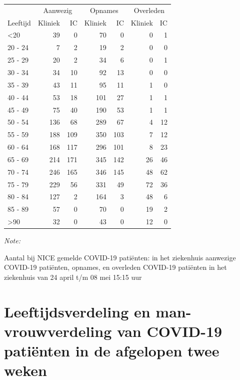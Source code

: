 \documentclass[
  english,
  man,floatsintext]{apa6}
\begin{document}
\begin{table}
\centering\begingroup\fontsize{10}{12}\selectfont

\begin{threeparttable}
\begin{tabular}{lrrrrrr}
\toprule
\multicolumn{1}{c}{ } & \multicolumn{2}{c}{Aanwezig} & \multicolumn{2}{c}{Opnames} & \multicolumn{2}{c}{Overleden} \\
\cmidrule(l{3pt}r{3pt}){2-3} \cmidrule(l{3pt}r{3pt}){4-5} \cmidrule(l{3pt}r{3pt}){6-7}
Leeftijd & Kliniek & IC & Kliniek & IC & Kliniek & IC\\
\midrule
<20 & 39 & 0 & 70 & 0 & 0 & 1\\
20 - 24 & 7 & 2 & 19 & 2 & 0 & 0\\
25 - 29 & 20 & 2 & 34 & 6 & 0 & 1\\
30 - 34 & 34 & 10 & 92 & 13 & 0 & 0\\
35 - 39 & 43 & 11 & 95 & 11 & 1 & 0\\
40 - 44 & 53 & 18 & 101 & 27 & 1 & 1\\
45 - 49 & 75 & 40 & 190 & 53 & 1 & 1\\
50 - 54 & 136 & 68 & 289 & 67 & 4 & 12\\
55 - 59 & 188 & 109 & 350 & 103 & 7 & 12\\
60 - 64 & 168 & 117 & 296 & 101 & 8 & 23\\
65 - 69 & 214 & 171 & 345 & 142 & 26 & 46\\
70 - 74 & 246 & 165 & 346 & 145 & 48 & 62\\
75 - 79 & 229 & 56 & 331 & 49 & 72 & 36\\
80 - 84 & 127 & 2 & 164 & 3 & 48 & 6\\
85 - 89 & 57 & 0 & 70 & 0 & 19 & 2\\
>90 & 32 & 0 & 43 & 0 & 12 & 0\\
\bottomrule
\end{tabular}
\begin{tablenotes}
\item \textit{Note: } 
\item Aantal bij NICE gemelde COVID-19 patiënten: in het ziekenhuis aanwezige COVID-19 patiënten, opnames, en overleden COVID-19 patiënten in het ziekenhuis van 24 april t/m 08 mei 15:15 uur
\end{tablenotes}
\end{threeparttable}
\endgroup{}
\end{table}

\newpage

\hypertarget{leeftijdsverdeling-en-man-vrouwverdeling-van-covid-19-patiuxebnten-in-de-afgelopen-twee-weken}{%
\section{Leeftijdsverdeling en man-vrouwverdeling van COVID-19 patiënten in de afgelopen twee weken}\label{leeftijdsverdeling-en-man-vrouwverdeling-van-covid-19-patiuxebnten-in-de-afgelopen-twee-weken}}
\end{document}
